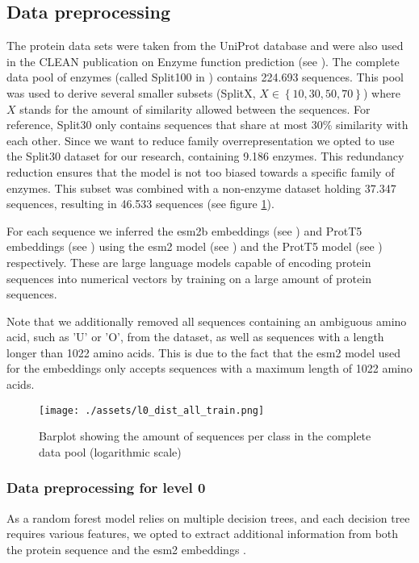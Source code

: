 \documentclass{bioinfo}
\begin{document}
\begin{methods}
\subsection{Data preprocessing}

The protein data sets were taken from the UniProt database and were also used in the CLEAN publication on Enzyme function prediction (see \cite{CleanArticle}). 
The complete data pool of enzymes (called Split100 in \cite{CLEANgit}) contains 224.693 sequences. 
This pool was used to derive several smaller subsets (SplitX, $X \in \left\{10, 30, 50, 70\right\}$) where $X$ stands for the amount of similarity allowed between the sequences.
For reference, Split30 only contains sequences that share at most 30\% similarity with each other.
Since we want to reduce family overrepresentation we opted to use the Split30 dataset for our research,
containing 9.186 enzymes.
This redundancy reduction ensures that the model is not too biased towards a specific family of enzymes.
This subset was combined with a non-enzyme dataset holding 37.347 sequences, resulting in 46.533 sequences (see figure \ref{fig:DataPoolDist}).

For each sequence we inferred the esm2b embeddings (see \cite{ESM2}) and ProtT5 embeddings (see \cite{ProtT5}) 
using the esm2 model (see \cite{ESM2}) and the ProtT5 model (see \cite{ProtT5}) respectively.
These are large language models capable of encoding protein sequences into numerical vectors
by training on a large amount of protein sequences. 


Note that we additionally removed all sequences containing an ambiguous amino acid, such as 'U' or 'O', from the dataset, as well as
sequences with a length longer than 1022 amino acids. 
This is due to the fact that the esm2 model used for the embeddings only accepts sequences 
with a maximum length of 1022 amino acids. 

\begin{figure}[!htbp]
\texttt{[image: ./assets/l0\_dist\_all\_train.png]}
\caption{Barplot showing the amount of sequences per class in the complete data pool (logarithmic scale)}\label{fig:DataPoolDist}
\end{figure}

\subsubsection{Data preprocessing for level 0}
As a random forest model relies on multiple decision trees, and each decision tree requires various features,
we opted to extract additional information from both the protein sequence and the esm2 embeddings \cite{ESM2}.


\end{methods}
\end{document}
